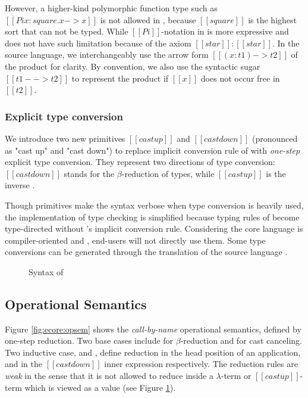However, a higher-kind polymorphic function type such as $[[Pi x:square.x->x]]$ is not allowed in \cc, because $[[square]]$ is the highest sort that can not be typed. While $[[Pi]]$-notation in \ecore is more expressive and does not have such limitation because of the axiom $[[star]]:[[star]]$. In the source language, we interchangeably use the arrow form $[[(x:t1)->t2]]$ of the product for clarity. By convention, we also use the syntactic sugar $[[t1 --> t2]]$ to represent the product if $[[x]]$ does not occur free in $[[t2]]$.

\subsubsection{Explicit type conversion}
We introduce two new primitives $[[castup]]$ and $[[castdown]]$ (pronounced as "cast up" and "cast down") to replace implicit conversion rule of \cc with \emph{one-step} explicit type conversion. They represent two directions of type conversion: $[[castdown]]$ stands for the $\beta$-reduction of types, while $[[castup]]$ is the inverse .

Though \cast primitives make the syntax verbose when type conversion is heavily used, the implementation of type checking is simplified because typing rules of \ecore become type-directed without \cc's implicit conversion rule. Considering the core language is compiler-oriented and , end-users will not directly use them. Some type conversions can be generated through the translation of the source language \fixme{(\S \ref{sec:src})}.

\begin{figure}
    \gram{\ottec\ottinterrule
        \ottG\ottinterrule
        \ottv}
    \caption{Syntax of \ecore}
    \label{fig:ecore:syntax}
\end{figure}

\subsection{Operational Semantics}\label{sec:ecore:opsem}
Figure \ref{fig:ecore:opsem} shows the \emph{call-by-name} operational semantics, defined by one-step reduction. Two base cases include  for $\beta$-reduction and  for cast canceling. Two inductive case,  and , define reduction in the head position of an application, and in the $[[castdown]]$ inner expression respectively. The reduction rules are \emph{weak} in the sense that it is not allowed to reduce inside a $\lambda$-term or $[[castup]]$-term which is viewed as a value (see Figure \ref{fig:ecore:syntax}).

